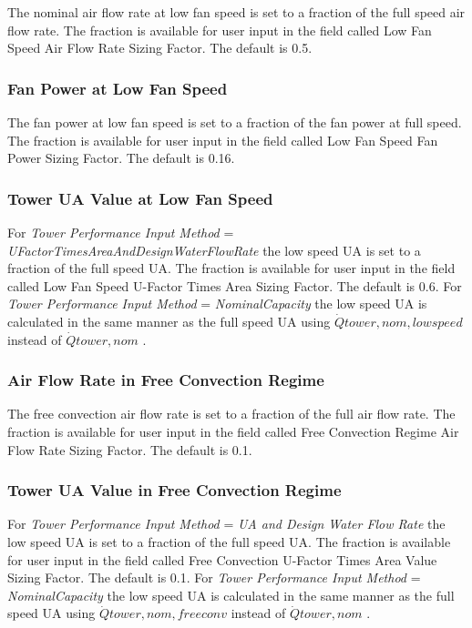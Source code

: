 The nominal air flow rate at low fan speed is set to a fraction of the full speed air flow rate. The fraction is available for user input in the field called Low Fan Speed Air Flow Rate Sizing Factor. The default is 0.5.

\subsubsection{Fan Power at Low Fan Speed}\label{fan-power-at-low-fan-speed}

The fan power at low fan speed is set to a fraction of the fan power at full speed. The fraction is available for user input in the field called Low Fan Speed Fan Power Sizing Factor. The default is 0.16.

\subsubsection{Tower UA Value at Low Fan Speed}\label{tower-ua-value-at-low-fan-speed}

For \emph{Tower Performance Input Method} = \emph{UFactorTimesAreaAndDesignWaterFlowRate} the low speed UA is set to a fraction of the full speed UA. The fraction is available for user input in the field called Low Fan Speed U-Factor Times Area Sizing Factor. The default is 0.6. For \emph{Tower Performance Input Method} = \emph{NominalCapacity} the low speed UA is calculated in the same manner as the full speed UA using \(\dot Qtower,nom,lowspeed\) instead of \(\dot Qtower,nom\) .

\subsubsection{Air Flow Rate in Free Convection Regime}\label{air-flow-rate-in-free-convection-regime}

The free convection air flow rate is set to a fraction of the full air flow rate. The fraction is available for user input in the field called Free Convection Regime Air Flow Rate Sizing Factor. The default is 0.1.

\subsubsection{Tower UA Value in Free Convection Regime}\label{tower-ua-value-in-free-convection-regime}

For \emph{Tower Performance Input Method} = \emph{UA and Design Water Flow Rate} the low speed UA is set to a fraction of the full speed UA. The fraction is available for user input in the field called Free Convection U-Factor Times Area Value Sizing Factor. The default is 0.1. For \emph{Tower Performance Input Method} = \emph{NominalCapacity} the low speed UA is calculated in the same manner as the full speed UA using \(\dot Qtower,nom,freeconv\) instead of \(\dot Qtower,nom\) .

